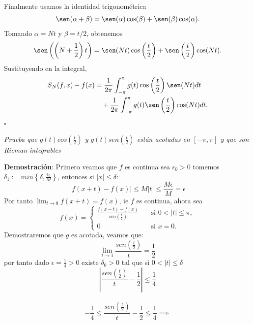 \documentclass[11pt,letterpaper]{article}
\begin{document}
Finalmente usamos la identidad trigonométrica
\begin{equation*}
    \sen(\alpha+\beta)=\sen(\alpha)\cos(\beta)+\sen(\beta)\cos(\alpha).
\end{equation*}
Tomando $\alpha=Nt$ y $\beta=t/2$, obtenemos
\begin{equation*}
    \sen\left(\left(N+\frac12\right)t\right)
    =\sen(Nt)\cos\left(\frac{t}{2}\right)
    +\sen\left(\frac{t}{2}\right)\cos(Nt).
\end{equation*}
Sustituyendo en la integral,
\begin{align*}
    S_N(f,x)-f(x)
    &=\frac{1}{2\pi}\int_{-\pi}^{\pi}g(t)\cos\left(\frac{t}{2}\right)\sen(Nt)dt \\
    &\quad +\frac{1}{2\pi}\int_{-\pi}^{\pi}g(t)\sen\left(\frac{t}{2}\right)\cos(Nt)dt.
\end{align*}
\hfill $\square$
\begin{tcolorbox}[title=\textcolor{white}{Problema 10}]
\textit{Prueba que $g(t)cos\left(\frac{t}{2}\right)$ y $g(t)sen\left(\frac{t}{2}\right)$ est\'an acotadas en $[-\pi,\pi]$ y que son Rieman integrables}
\end{tcolorbox}
\textbf{Demostraci\'on}: Primero veamos que $f$ es continua sea $\epsilon_0>0$ tomemos $\delta_1:=min\left\{\delta,\frac{\epsilon_0}{M}\right\}$, entonces si $|x|\leq \delta$:\,\\
\begin{equation*}
    |f(x+t)-f(x)|\leq M|t|\leq \frac{M \epsilon}{M}=\epsilon
\end{equation*}
Por tanto $\displaystyle \lim_{t\to 0}f(x+t)=f(x)$, ie $f$ es continua, ahora sea
\[
f(x) =
\begin{cases}
\frac{f(x-t)-f(x)}{sen\left(\frac{t}{2}\right)} \quad & \text{si } 0<|t|\leq\pi, \\
0 \quad  & \text{si } x =0.
\end{cases}
\]
Demostraremos que $g$ es acotada, veamos que:\,\\
\begin{equation*}
    \lim_{t\to 1} \frac{sen\left(\frac{t}{2}\right)}{t}=\frac{1}{2}
\end{equation*}
por tanto dado $\epsilon=\frac{1}{4}>0$ existe $\delta_0>0$ tal que si $0<|t|\leq \delta$
\begin{equation*}
    \left|\frac{sen\left(\frac{t}{2}\right)}{t}-\frac{1}{2}\right|\leq \frac{1}{4}
\end{equation*}\,\\
\begin{equation*}
    -\frac{1}{4}\leq\frac{sen\left(\frac{t}{2}\right)}{t}-\frac{1}{2}\leq \frac{1}{4}\implies
\end{equation*}
\end{document}
